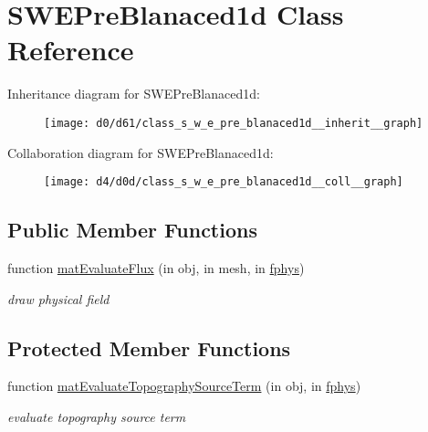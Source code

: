\hypertarget{class_s_w_e_pre_blanaced1d}{}\section{S\+W\+E\+Pre\+Blanaced1d Class Reference}
\label{class_s_w_e_pre_blanaced1d}


Inheritance diagram for S\+W\+E\+Pre\+Blanaced1d\+:
\nopagebreak
\begin{figure}[H]
\begin{center}
\leavevmode
\texttt{[image: d0/d61/class\_s\_w\_e\_pre\_blanaced1d\_\_inherit\_\_graph]}
\end{center}
\end{figure}


Collaboration diagram for S\+W\+E\+Pre\+Blanaced1d\+:
\nopagebreak
\begin{figure}[H]
\begin{center}
\leavevmode
\texttt{[image: d4/d0d/class\_s\_w\_e\_pre\_blanaced1d\_\_coll\_\_graph]}
\end{center}
\end{figure}
\subsection*{Public Member Functions}
\begin{DoxyCompactItemize}
\item 
function \hyperlink{class_s_w_e_pre_blanaced1d_a1326c41b66100e968e6e758e7f51268e}{mat\+Evaluate\+Flux} (in obj, in mesh, in \hyperlink{class_ndg_phys_a6b25724fc9474d32018439009072f0a9}{fphys})
\begin{DoxyCompactList}\small\item\em draw physical field \end{DoxyCompactList}\end{DoxyCompactItemize}
\subsection*{Protected Member Functions}
\begin{DoxyCompactItemize}
\item 
function \hyperlink{class_s_w_e_pre_blanaced1d_ad445cdfa31a01ce7d027c44193c2657a}{mat\+Evaluate\+Topography\+Source\+Term} (in obj, in \hyperlink{class_ndg_phys_a6b25724fc9474d32018439009072f0a9}{fphys})
\begin{DoxyCompactList}\small\item\em evaluate topography source term \end{DoxyCompactList}\end{DoxyCompactItemize}
